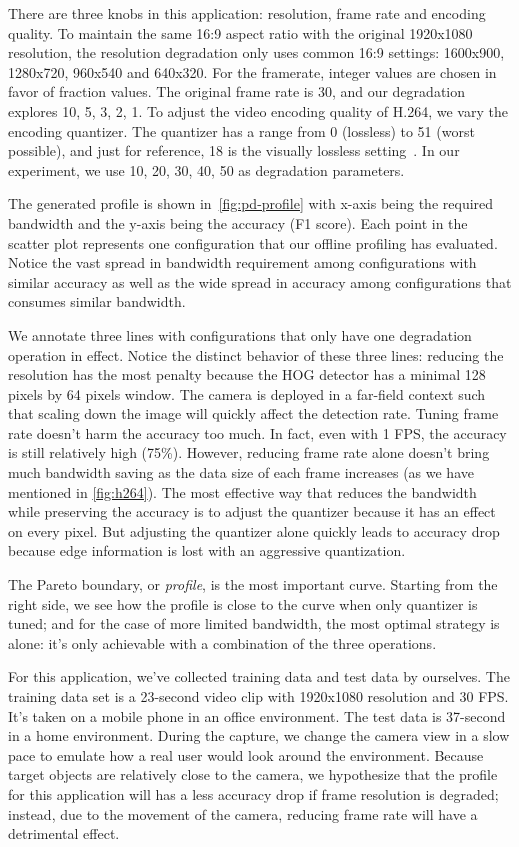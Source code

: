There are three knobs in this application: resolution, frame rate and encoding
quality. To maintain the same 16:9 aspect ratio with the original 1920x1080
resolution, the resolution degradation only uses common 16:9 settings: 1600x900,
1280x720, 960x540 and 640x320. For the framerate, integer values are chosen in
favor of fraction values. The original frame rate is 30, and our degradation
explores 10, 5, 3, 2, 1. To adjust the video encoding quality of H.264, we vary
the encoding quantizer. The quantizer has a range from 0 (lossless) to 51 (worst
possible), and just for reference, 18 is the visually lossless
setting~\cite{bellard2012ffmpeg}. In our experiment, we use 10, 20, 30, 40, 50
as degradation parameters.

The generated profile is shown in~\autoref{fig:pd-profile} with x-axis being the
required bandwidth and the y-axis being the accuracy (F1 score). Each point in
the scatter plot represents one configuration that our offline profiling has
evaluated. Notice the vast spread in bandwidth requirement among configurations
with similar accuracy as well as the wide spread in accuracy among
configurations that consumes similar bandwidth.

We annotate three lines with configurations that only have one degradation
operation in effect. Notice the distinct behavior of these three lines: reducing
the resolution has the most penalty because the HOG detector has a minimal 128
pixels by 64 pixels window. The camera is deployed in a far-field context such
that scaling down the image will quickly affect the detection rate. Tuning frame
rate doesn't harm the accuracy too much. In fact, even with 1 FPS, the accuracy
is still relatively high (75\%). However, reducing frame rate alone doesn't
bring much bandwidth saving as the data size of each frame increases (as we have
mentioned in \autoref{fig:h264}). The most effective way that reduces the
bandwidth while preserving the accuracy is to adjust the quantizer because it
has an effect on every pixel. But adjusting the quantizer alone quickly leads to
accuracy drop because edge information is lost with an aggressive
quantization.

The Pareto boundary, or \textit{profile}, is the most important curve. Starting
from the right side, we see how the profile is close to the curve when only
quantizer is tuned; and for the case of more limited bandwidth, the most optimal
strategy is alone: it's only achievable with a combination of the three
operations.

 For this application, we've collected training data
and test data by ourselves. The training data set is a 23-second video clip with
1920x1080 resolution and 30 FPS. It's taken on a mobile phone in an office
environment. The test data is 37-second in a home environment. During the
capture, we change the camera view in a slow pace to emulate how a real user
would look around the environment. Because target objects are relatively close
to the camera, we hypothesize that the profile for this application will has a
less accuracy drop if frame resolution is degraded; instead, due to the movement
of the camera, reducing frame rate will have a detrimental effect.

